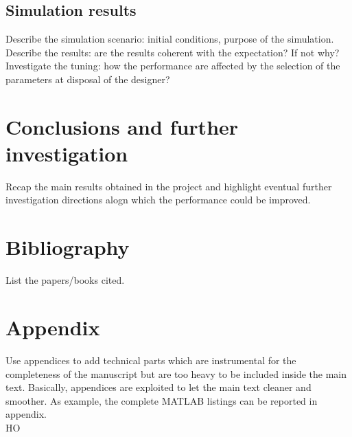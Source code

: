 \documentclass[]{report}
\begin{document}
\section{Simulation results}
Describe the simulation scenario: initial conditions, purpose of the simulation. Describe the results: are the results coherent with the expectation? If not why? Investigate the tuning: how the performance are affected by the selection of the parameters at disposal of the designer?

\chapter{Conclusions and further investigation}
Recap the main results obtained in the project and highlight eventual further investigation directions alogn which the performance could be improved. 

\newpage
\chapter*{Bibliography}
List the papers/books cited.

\newpage
\appendix
\chapter*{Appendix}
Use appendices to add technical parts which are instrumental for the completeness of the manuscript but are too heavy to be included inside the main text. Basically, appendices are exploited to let the main text cleaner and smoother. As example, the complete MATLAB listings can be reported in appendix.\\

HO
\end{document}
